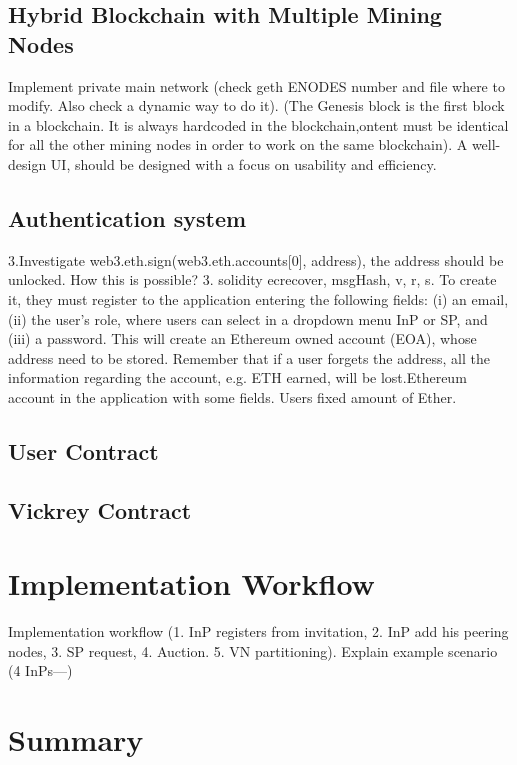 \subsection{Hybrid Blockchain with Multiple Mining Nodes}

Implement private main network (check geth ENODES number and file where to modify. Also check a dynamic way to do it).
(The Genesis block is the first block in a blockchain. It is always hardcoded in the blockchain,ontent must be identical for all the other mining nodes in order to work on the same blockchain). A well-design UI, should be designed with a focus on usability and efficiency.

\subsection{Authentication system}

3.Investigate web3.eth.sign(web3.eth.accounts[0], address), the address should be unlocked. How this is possible?
3. solidity ecrecover, msgHash, v, r, s.
To create it, they must register to the application entering the following fields: (i) an email, (ii) the user's role, where users can select in a dropdown menu InP or SP, and (iii) a password. This will create an Ethereum owned account (EOA), whose address need to be stored. Remember that if a user forgets the address, all the information regarding the account, e.g. ETH earned, will be lost.Ethereum account in the application with some fields. Users fixed amount of Ether. 

\subsection{User Contract}

\subsection{Vickrey Contract}

\section{Implementation Workflow}

Implementation workflow (1. InP registers from invitation, 2. InP add his peering nodes, 3. SP request, 4. Auction. 5. VN partitioning).
Explain example scenario (4 InPs---)

\section{Summary}

